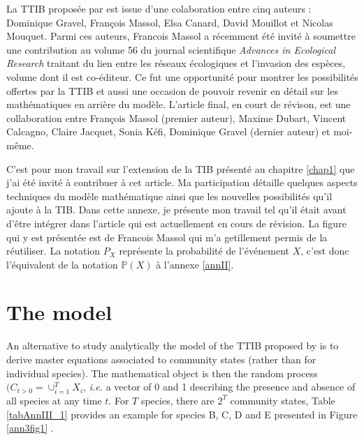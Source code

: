 \label{annIII}
\addtocounter{chapter}{1}
\setcounter{equation}{0}


La TTIB proposée par \cite{Gravel2011} est issue d'une colaboration entre cinq auteurs :
Dominique Gravel, François Massol, Elsa Canard, David Mouillot et Nicolas Mouquet.
Parmi ces auteurs, Francois Massol a récemment été invité à soumettre une
contribution au volume 56 du journal scientifique
\emph{Advances in Ecological Research} traitant du lien entre les réseaux
écologiques et l'invasion des espèces, volume dont il est co-éditeur.
Ce fut une opportunité pour montrer les possibilités offertes par la TTIB et aussi
une occasion de pouvoir revenir en détail sur les mathématiques en arrière du modèle.
L'article final, en court de révison, est une collaboration entre François Massol
(premier auteur), Maxime Dubart, Vincent Calcagno, Claire Jacquet, Sonia Kéfi,
Dominique Gravel (dernier auteur) et moi-même.

C'est pour mon travail sur l'extension de la TIB présenté au chapitre \ref{chap1}
que j'ai été invité à contribuer à cet article. Ma participation détaille
quelques aspects techniques du modèle mathématique ainsi que les nouvelles
possibilités qu'il ajoute à la TIB.
Dans cette annexe, je présente mon travail tel qu'il était avant d'être intégrer
dans l'article qui est actuellement en cours de révision.
La figure qui y est présentée est de Francois Massol qui m'a getillement permis
de la réutiliser. La notation $P_{X}$ représente la probabilité de l'événement
$X$, c'est donc l'équivalent de la notation $\mathbb{P}(X)$ à l'annexe \ref{annII}.



\section{The model}\label{the-model}

An alternative to study analytically the model of the TTIB proposed by \cite{Gravel2011}
is to derive master equations associated to community states (rather than for individual species).
The mathematical object is then the random process
$(C_{t>0}=\cup_{i=1}^TX_i$, \emph{i.e.} a vector of 0 and 1 describing
the presence and absence of all species at any time \(t\). For \(T\)
species, there are \(2^T\) community states, Table \ref{tabAnnIII_1} provides an example
for species B, C, D and E presented in Figure \ref{ann3fig1} .


